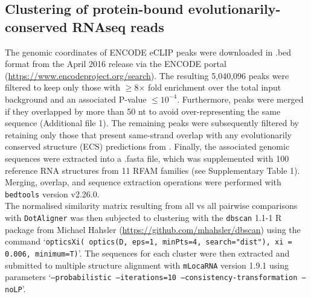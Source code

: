 \documentclass{bmcart}
\newcommand\dotaligner{\texttt{DotAligner}}
\begin{document}
\subsection*{Clustering of protein-bound evolutionarily-conserved RNAseq reads}

The genomic coordinates of ENCODE eCLIP peaks were downloaded in .bed format from the April 2016 release via the ENCODE portal (\url{https://www.encodeproject.org/search}). The resulting 5,040,096 peaks 
were filtered to keep only those with $\ge$8$\times$ fold enrichment over the total input background and an associated P-value  $\leq10^{-4}$. Furthermore, peaks were merged if they overlapped by more than 50 nt to avoid over-representing the same sequence (Additional file 1). The remaining peaks were subsequently filtered by 
retaining only those that present same-strand overlap with any evolutionarily conserved structure (ECS) predictions from \cite{smith2013widespread}. Finally, the associated genomic sequences were extracted into a .fasta file, which was supplemented with 100 reference RNA structures from 11 RFAM families (see Supplementary Table 1). 
Merging, overlap, and sequence extraction operations were performed with \texttt{bedtools} version v2.26.0. \\

The normalised similarity matrix resulting from all vs all pairwise comparisons with \dotaligner{} was then 
subjected to clustering with the \texttt{dbscan} 1.1-1 R package from Michael Hahsler (\url{https://github.com/mhahsler/dbscan}) using the command `\texttt{opticsXi( optics(D, eps=1, minPts=4, search="dist"), xi = 0.006, minimum=T)}'. The sequences for each cluster were then extracted and submitted to multiple structure alignment with \texttt{mLocaRNA} version 1.9.1 using parameters  `\texttt{--probabilistic --iterations=10  --consistency-transformation --noLP}'.\\
 

\end{document}
